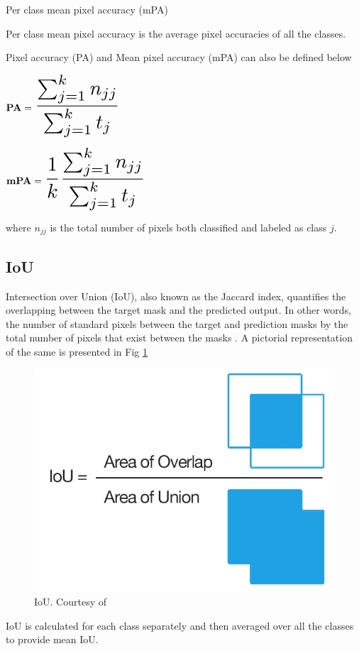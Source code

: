     
    Per class mean pixel accuracy (mPA)
    
    Per class mean pixel accuracy is the average pixel accuracies of all the classes.
    
    Pixel accuracy (PA) and Mean pixel accuracy (mPA) can also be defined below \cite{84_ulku2022survey}
    
    $
    {\bf PA } = \scalemath{2}{\frac{\sum_{j=1}^{k} n_{jj}}{\sum_{j=1}^{k} t_j} }
    $
    
    $
    {\bf mPA } = \scalemath{2}{\frac{1}{k} \frac{\sum_{j=1}^{k} n_{jj}}{\sum_{j=1}^{k} t_j}}
    $
    
    where $n_{jj}$ is the total number of pixels both classified and labeled as class $j$. 
    
    \subsection{IoU}
    
    Intersection over Union (IoU), also known as the Jaccard index, quantifies the overlapping between the target mask and the predicted output. In other words, the number of standard pixels between the target and prediction masks by the total number of pixels that exist between the masks \cite{83_iou}. A pictorial representation of the same is presented in Fig \ref{fig:IoU}
    
    \begin{figure}[h]
    	\centering
    	\includegraphics[width=12cm]{images/IoU.png}
    	\caption{IoU. Courtesy of \cite{82_iou}}
    	\label{fig:IoU}
    \end{figure}  
	
	IoU is calculated for each class separately and then averaged over all the classes to provide mean IoU.  
	
